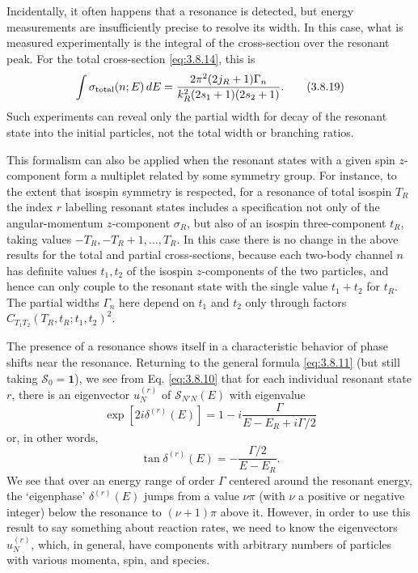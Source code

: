 Incidentally, it often happens that a resonance is detected, but energy
measurements are insufficiently precise to resolve its width. In this case,
what is measured experimentally is the integral of the cross-section over the
resonant peak. For the total cross-section \eqref{eq:3.8.14}, this is
\begin{equation}
  \int\sigma_{\rm total}(n;E)\,dE
  =\frac{2\pi^2(2j_R+1)\Gamma_n}
   {k_R^2(2s_1+1)(2s_2+1)}.
  \tag{3.8.19}\label{eq:3.8.19}
\end{equation}
Such experiments can reveal only the partial width for decay of the resonant
state into the initial particles, not the total width or branching ratios.

This formalism can also be applied when the resonant states with a given spin
$z$-component form a multiplet related by some symmetry group. For instance,
to the extent that isospin symmetry is respected, for a resonance of total
isospin $T_R$ the index $r$ labelling resonant states includes a specification
not only of the angular-momentum $z$-component $\sigma_R$, but also of an
isospin three-component $t_R$, taking values $-T_R,-T_R+1,\ldots,T_R$. In
this case there is no change in the above results for the total and partial
cross-sections, because each two-body channel $n$ has definite values $t_1,t_2$
of the isospin $z$-components of the two particles, and hence can only couple
to the resonant state with the single value $t_1+t_2$ for $t_R$. The partial
widths $\Gamma_n$ here depend on $t_1$ and $t_2$ only through factors
$C_{T_1T_2}(T_R,t_R;t_1,t_2)^2$.

The presence of a resonance shows itself in a characteristic behavior of
phase shifts near the resonance. Returning to the general formula \eqref{eq:3.8.11}
(but still taking $\mathcal S_0=\mathbf{1}$), we see from Eq. \eqref{eq:3.8.10} that
for each individual resonant state $r$, there is an eigenvector $u_N^{(r)}$
of $\mathcal S_{N'N}(E)$ with eigenvalue
\[
  \exp[2i\delta^{(r)}(E)]
  =1-i\frac{\Gamma}{E-E_R+i\Gamma/2}
\]
or, in other words,
\begin{equation}
  \tan\delta^{(r)}(E)=-\frac{\Gamma/2}{E-E_R}.
  \tag{3.8.20}\label{eq:3.8.20}
\end{equation}
We see that over an energy range of order $\Gamma$ centered around the
resonant energy, the `eigenphase' $\delta^{(r)}(E)$ jumps from a value
$\nu\pi$ (with $\nu$ a positive or negative integer) below the resonance to
$(\nu+1)\pi$ above it. However, in order to use this result to say something
about reaction rates, we need to know the eigenvectors $u_N^{(r)}$, which, in
general, have components with arbitrary numbers of particles with various
momenta, spin, and species.

